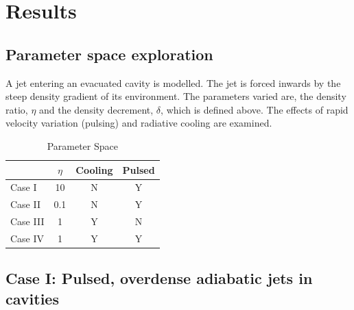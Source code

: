 \section{Results}

\subsection{Parameter space exploration}

A jet entering an evacuated cavity is modelled.
The jet is forced inwards by the steep
density gradient of its environment.  
The parameters varied are, the density ratio, $\eta$ and the density decrement, $\delta$, which is defined above.
The effects of rapid velocity variation (pulsing) and radiative cooling are examined.

\begin{table}
\begin{center}
\begin{tabular}{l c c c}
\hline
       & $\eta$ & Cooling & Pulsed\\
\hline
 Case I &   10    &  N & Y\\
\hline
 Case II &   0.1  & N & Y \\ 
\hline
 Case III &   1   &  Y & N\\
\hline
 Case IV &   1   & Y & Y\\
\hline
 \end{tabular}
 \caption{Parameter Space}
\label{Parameter Space}
 \end{center}
 \end{table}


\subsection{Case I: Pulsed, overdense adiabatic jets in cavities}

